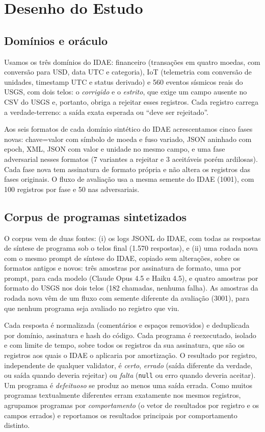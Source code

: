 \documentclass[sigconf,nonacm]{acmart}
\begin{document}
\section{Desenho do Estudo}
\label{sec:desenho}

\subsection{Domínios e oráculo}

Usamos os três domínios do IDAE: financeiro (transações em quatro moedas, com conversão para USD, data UTC e categoria), IoT (telemetria com conversão de unidades, timestamp UTC e status derivado) e 560 eventos sísmicos reais do USGS, com dois telos: o \textit{corrigido} e o \textit{estrito}, que exige um campo ausente no CSV do USGS e, portanto, obriga a rejeitar esses registros. Cada registro carrega a verdade-terreno: a saída exata esperada ou ``deve ser rejeitado''.

Aos seis formatos de cada domínio sintético do IDAE acrescentamos cinco fases novas: chave=valor com símbolo de moeda e fuso variado, JSON aninhado com epoch, XML, JSON com valor e unidade no mesmo campo, e uma fase adversarial nesses formatos (7 variantes a rejeitar e 3 aceitáveis porém ardilosas). Cada fase nova tem assinatura de formato própria e não altera os registros das fases originais. O fluxo de avaliação usa a mesma semente do IDAE (1001), com 100 registros por fase e 50 nas adversariais.

\subsection{Corpus de programas sintetizados}
\label{sec:corpus}

O corpus vem de duas fontes: (i) os logs JSONL do IDAE, com todas as respostas de síntese de programa sob o telos final (1.570 respostas), e (ii) uma rodada nova com o mesmo prompt de síntese do IDAE, copiado sem alterações, sobre os formatos antigos e novos: três amostras por assinatura de formato, uma por prompt, para cada modelo (Claude Opus 4.5 e Haiku 4.5), e quatro amostras por formato do USGS nos dois telos (182 chamadas, nenhuma falha). As amostras da rodada nova vêm de um fluxo com semente diferente da avaliação (3001), para que nenhum programa seja avaliado no registro que viu.

Cada resposta é normalizada (comentários e espaços removidos) e deduplicada por domínio, assinatura e hash do código. Cada programa é reexecutado, isolado e com limite de tempo, sobre todos os registros da sua assinatura, que são os registros aos quais o IDAE o aplicaria por amortização. O resultado por registro, independente de qualquer validator, é \textit{certo}, \textit{errado} (saída diferente da verdade, ou saída quando deveria rejeitar) ou \textit{falta} (\texttt{null} ou erro quando deveria aceitar). Um programa é \textit{defeituoso} se produz ao menos uma saída errada. Como muitos programas textualmente diferentes erram exatamente nos mesmos registros, agrupamos programas por \textit{comportamento} (o vetor de resultados por registro e os campos errados) e reportamos os resultados principais por comportamento distinto.
\end{document}
